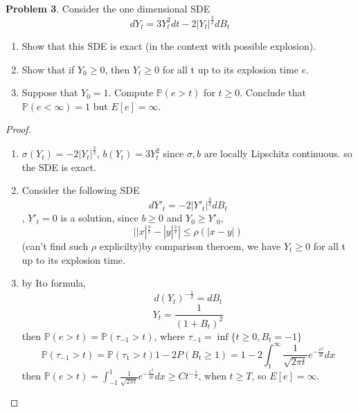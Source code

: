\documentclass{article}     %
\begin{document}
    
    
    
    
    
    
    
    
    
    
    
    
    
    
\noindent
    \textbf{Problem 3}. Consider the one dimensional SDE
    \[dY_t = 3Y_t^2 dt - 2|Y_t|^{\frac{3}{2}}dB_t\]
    \begin{enumerate}[(1)]
        \item Show that this SDE is exact (in the context with possible explosion).
        \item Show that if $Y_0\geq 0$, then $Y_t\geq 0$ for all t up to its explosion time $e$.
        \item Suppose that $Y_0=1$. Compute $\mathbb{P}(e>t)$ for $t\geq 0$. Conclude that $\mathbb{P}(e<\infty) = 1$ but  $E[e] = \infty$.
    \end{enumerate}
    \begin{proof}
    \begin{enumerate}[(1)]
    \item $\sigma(Y_t) = -2|Y_t|^{\frac{3}{2}}$, $b(Y_t) = 3Y_t^2$
    since $\sigma,b$ are locally Lipschitz continuous. so the SDE is exact.
    \item Consider the following SDE
    \[dY'_t = -2|Y'_t|^{\frac{3}{2}}dB_t\],
    $Y'_t = 0$ is a solution, since $b\geq 0$ and $Y_0 \geq Y'_0$, 
    \[||x|^{\frac{3}{2}}-|y|^{\frac{3}{2}}| \leq \rho(|x-y|)\]
   (can't find such $\rho$ explicilty)by comparison theroem, we have $Y_t\geq 0 $ for all t up to its explosion time.
    \item by Ito formula, 
     \[d(Y_t)^{-\frac{1}{2}} = dB_t\]
     \[Y_t = \frac{1}{(1+B_t)^2}\]
     then $\mathbb{P}(e> t) = \mathbb{P}(\tau_{-1} > t)$, where $\tau_{-1} = \inf\{t\geq 0, B_t =-1\}$
     \[\mathbb{P}(\tau_{-1}>t) = \mathbb{P}(\tau_1> t)1-2P(B_t \geq 1)=1-2\int_1^{\infty}\frac{1}{\sqrt{2\pi t}}e^{-\frac{x^2}{2t}}dx \]
     then $\mathbb{P}(e>t) =\int_{-1}^1 \frac{1}{\sqrt{2\pi t}}e^{-\frac{x^2}{2t}}dx\geq Ct^{-\frac{1}{2}}$, when $t\geq T$, so $E[e]=\infty$.
    \end{enumerate}
    \end{proof}
    
\end{document}
